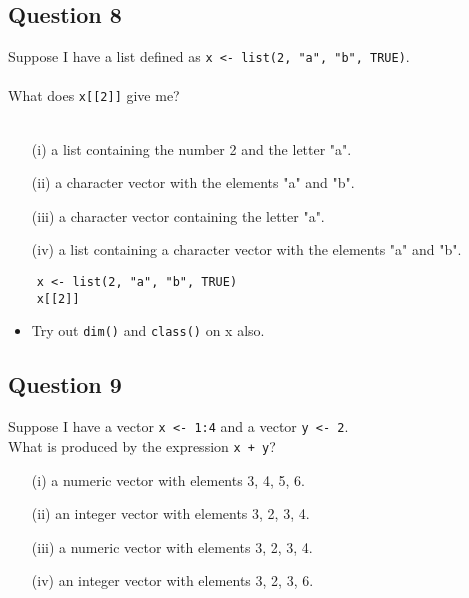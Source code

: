 \documentclass[12pt]{article}
\begin{document}
\newpage
\subsection*{Question 8}
\Large
Suppose I have a list defined as \texttt{x <- list(2, "a", "b", TRUE)}. \\ \\ What does \texttt{x[[2]]} give me?\\ \\
\begin{itemize}
\item[(i)] a list containing the number 2 and the letter "a".
\item[(ii)] a character vector with the elements "a" and "b".
\item[(iii)] a character vector containing the letter "a".
\item[(iv)] a list containing a character vector with the elements "a" and "b".
\end{itemize}

\begin{framed}
	\begin{verbatim}
	x <- list(2, "a", "b", TRUE)
	x[[2]]
	\end{verbatim}	
\end{framed}

\begin{itemize}
	\item Try out \texttt{dim()} and \texttt{class()} on x also.
	\end{itemize}
\newpage
\subsection*{Question 9}
\Large
Suppose I have a vector \texttt{x <- 1:4} and a vector \texttt{y <- 2}. \\ What is produced by the expression \texttt{x + y}?
\begin{itemize}
	\item[(i)] a numeric vector with elements 3, 4, 5, 6.
	\item[(ii)] an integer vector with elements 3, 2, 3, 4.
	\item[(iii)] a numeric vector with elements 3, 2, 3, 4.
	\item[(iv)] an integer vector with elements 3, 2, 3, 6.
\end{itemize}
\end{document}
